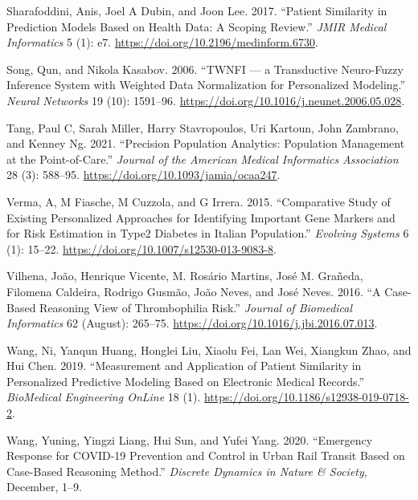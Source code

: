 \documentclass{article}
\newlength{\cslhangindent}
\newlength{\cslentryspacingunit} %
\newenvironment{CSLReferences}[2] %
 {%
  \setlength{\parindent}{0pt}
  \ifodd #1
  \let\oldpar\par
  \def\par{\hangindent=\cslhangindent\oldpar}
  \fi
  \setlength{\parskip}{#2\cslentryspacingunit}
 }%
 {}
\begin{document}
\begin{CSLReferences}{1}{0}
\leavevmode{}%
Sharafoddini, Anis, Joel A Dubin, and Joon Lee. 2017. {``Patient
{Similarity} in {Prediction Models Based} on {Health Data}: {A Scoping
Review}.''} \emph{JMIR Medical Informatics} 5 (1): e7.
\url{https://doi.org/10.2196/medinform.6730}.

\leavevmode{}%
Song, Qun, and Nikola Kasabov. 2006. {``{TWNFI} --- a Transductive
Neuro-Fuzzy Inference System with Weighted Data Normalization for
Personalized Modeling.''} \emph{Neural Networks} 19 (10): 1591--96.
\url{https://doi.org/10.1016/j.neunet.2006.05.028}.

\leavevmode{}%
Tang, Paul C, Sarah Miller, Harry Stavropoulos, Uri Kartoun, John
Zambrano, and Kenney Ng. 2021. {``Precision Population Analytics:
Population Management at the Point-of-Care.''} \emph{Journal of the
American Medical Informatics Association} 28 (3): 588--95.
\url{https://doi.org/10.1093/jamia/ocaa247}.

\leavevmode{}%
Verma, A, M Fiasche, M Cuzzola, and G Irrera. 2015. {``Comparative Study
of Existing Personalized Approaches for Identifying Important Gene
Markers and for Risk Estimation in {Type2 Diabetes} in {Italian}
Population.''} \emph{Evolving Systems} 6 (1): 15--22.
\url{https://doi.org/10.1007/s12530-013-9083-8}.

\leavevmode{}%
Vilhena, João, Henrique Vicente, M. Rosário Martins, José M. Grañeda,
Filomena Caldeira, Rodrigo Gusmão, João Neves, and José Neves. 2016.
{``A Case-Based Reasoning View of Thrombophilia Risk.''} \emph{Journal
of Biomedical Informatics} 62 (August): 265--75.
\url{https://doi.org/10.1016/j.jbi.2016.07.013}.

\leavevmode{}%
Wang, Ni, Yanqun Huang, Honglei Liu, Xiaolu Fei, Lan Wei, Xiangkun Zhao,
and Hui Chen. 2019. {``Measurement and Application of Patient Similarity
in Personalized Predictive Modeling Based on Electronic Medical
Records.''} \emph{BioMedical Engineering OnLine} 18 (1).
\url{https://doi.org/10.1186/s12938-019-0718-2}.

\leavevmode{}%
Wang, Yuning, Yingzi Liang, Hui Sun, and Yufei Yang. 2020. {``Emergency
{Response} for {COVID-19 Prevention} and {Control} in {Urban Rail
Transit Based} on {Case-Based Reasoning Method}.''} \emph{Discrete
Dynamics in Nature \& Society}, December, 1--9.


\end{CSLReferences}
\end{document}
